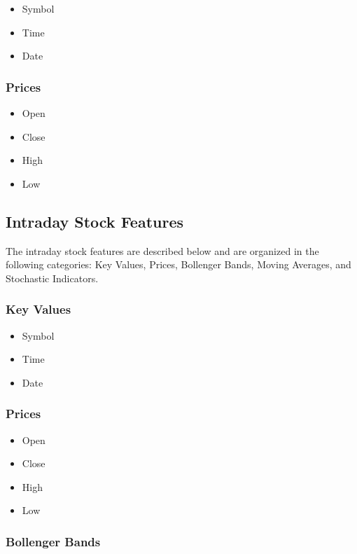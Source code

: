 \documentclass[journal]{IEEEtran}
\begin{document}
\begin{itemize}
	\item Symbol
	\item Time
	\item Date
\end{itemize}

\subsubsection{Prices}

\begin{itemize}
	\item Open
	\item Close
	\item High
	\item Low
\end{itemize}

\subsection{Intraday Stock Features}

The intraday stock features are described below and are organized in the 
 following categories: Key Values, Prices, Bollenger Bands, Moving Averages, and
  Stochastic Indicators.

\subsubsection{Key Values}

\begin{itemize}
	\item Symbol
	\item Time
	\item Date
\end{itemize}

\subsubsection{Prices}

\begin{itemize}
	\item Open
	\item Close
	\item High
	\item Low
\end{itemize}

\subsubsection{Bollenger Bands}
\end{document}
